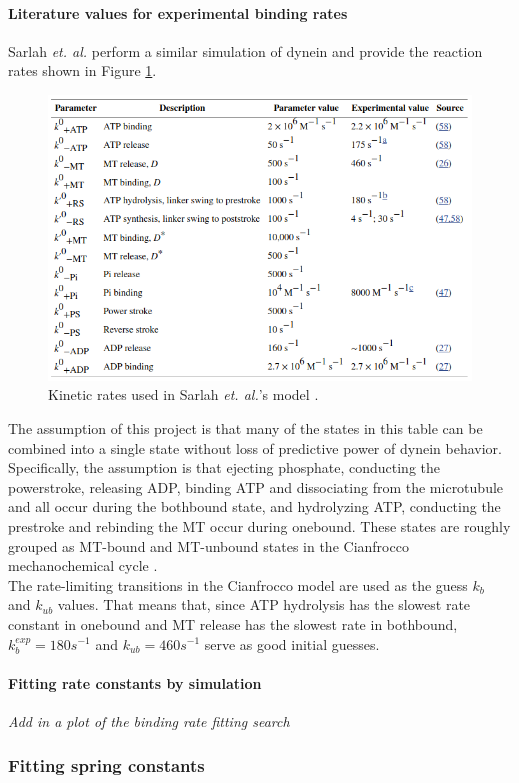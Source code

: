 \documentclass[10pt]{article} %
\begin{document}
\paragraph{Literature values for experimental binding rates}
Sarlah \textit{et. al.} \cite{sarlahmodel} perform a similar simulation of dynein and provide the reaction rates shown in Figure \ref{fig:sarlah-rate-table}.

\begin{figure}[h]
  \centering
  \includegraphics[width=.45\textwidth]{../../figures/SarlahParameterTable.png}
  \caption{Kinetic rates used in Sarlah \textit{et. al.}'s model \cite{sarlahmodel}.}
  \label{fig:sarlah-rate-table}
\end{figure}

The assumption of this project is that many of the states in this table can be combined into a single state without loss of predictive power of dynein behavior. Specifically, the assumption is that ejecting phosphate, conducting the powerstroke, releasing ADP, binding ATP and dissociating from the microtubule and all occur during the bothbound state, and hydrolyzing ATP, conducting the prestroke and rebinding the MT occur during onebound. These states are roughly grouped as MT-bound and MT-unbound states in the Cianfrocco mechanochemical cycle \cite{cianfroccoreview}.\\

The rate-limiting transitions in the Cianfrocco model are used as the guess $k_b$ and $k_{ub}$ values. That means that, since ATP hydrolysis has the slowest rate constant in onebound and MT release has the slowest rate in bothbound, $k_b^{exp} = 180 s^{-1}$ and $k_{ub} = 460 s^{-1}$ serve as good initial guesses.\\

\paragraph{Fitting rate constants by simulation}
\textit{Add in a plot of the binding rate fitting search}

\subsubsection{Fitting spring constants}
\end{document}
